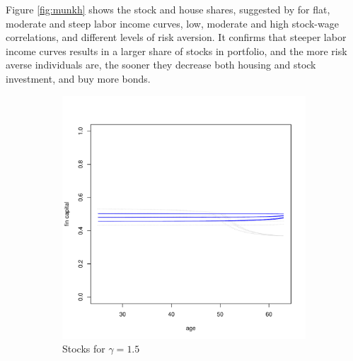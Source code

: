 Figure \ref{fig:munkh} shows the stock and house shares, suggested by \citet{munk} for flat, moderate and steep labor income curves, low, moderate and high stock-wage correlations, and different levels of risk aversion. It confirms that steeper labor income curves results in a larger share of stocks in portfolio, and the more risk averse individuals are, the sooner they decrease both housing and stock investment, and buy more bonds.

\clearpage
\begin{figure}[H]
	\centering
    \begin{subfigure}{0.45\textwidth}
		\centering
		\includegraphics[scale=0.25]{figs/smunkhouse15.pdf}
		\caption{Stocks for $\gamma = 1.5$}
	\end{subfigure}
	\hfill
    \begin{subfigure}{0.45\textwidth}
		\centering

\end{subfigure}
\end{figure}
